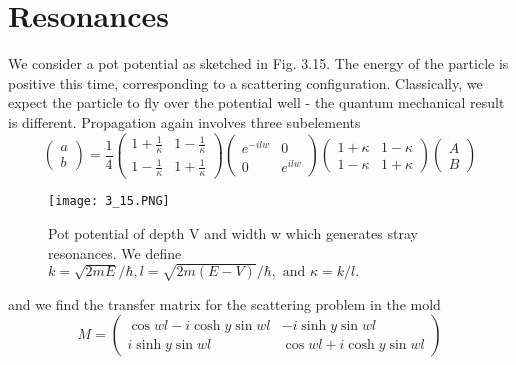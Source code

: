 \section{Resonances}
We consider a pot potential as sketched in Fig. 3.15. The energy of the particle is positive this time, corresponding to a scattering configuration. Classically, we expect the particle to fly over the potential well - the quantum mechanical result is different.
Propagation again involves three subelements
\begin{equation}
\left(\begin{array}{l}{a} \\ {b}\end{array}\right)=\frac{1}{4}\left(\begin{array}{cc}{1+\frac{1}{\kappa}} & {1-\frac{1}{\kappa}} \\ {1-\frac{1}{\kappa}} & {1+\frac{1}{\kappa}}\end{array}\right)\left(\begin{array}{cc}{e^{-i l w}} & {0} \\ {0} & {e^{i l w}}\end{array}\right)\left(\begin{array}{cc}{1+\kappa} & {1-\kappa} \\ {1-\kappa} & {1+\kappa}\end{array}\right)\left(\begin{array}{l}{A} \\ {B}\end{array}\right)
\end{equation}
\begin{figure}[ht]
    \begin{minipage}{0.5\textwidth}
        \centering
        \texttt{[image: 3\_15.PNG]}
    \end{minipage}
    \begin{minipage}{0.5\textwidth}
        \caption{Pot potential of depth V and width w which generates stray resonances. We define
        $k=\sqrt{2mE}/\hbar,l=\sqrt{2m(E-V)}/\hbar,\text{ and }\kappa=k/l.$}
    \end{minipage}
\end{figure}
and we find the transfer matrix for the scattering problem in the mold
\begin{equation}
M=\left(\begin{array}{cc}{\cos w l-i \cosh y \sin w l} & {-i \sinh y \sin w l} \\ {i \sinh y \sin w l} & {\cos w l+i \cosh y \sin w l}\end{array}\right)
\end{equation}
